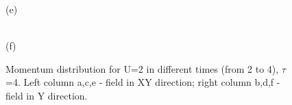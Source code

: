 \begin{figure}[h!]
\begin{minipage}[h]{0.43\linewidth}
\end{minipage}
\begin{minipage}[h]{0.43\linewidth}
 (e) \\
\end{minipage}
\hfill
\begin{minipage}[h]{0.43\linewidth}
 \\(f)
\end{minipage}
\caption{Momentum distribution for U=2 in different times (from 2 to 4), $\tau$=4. Left column a,c,e - field in XY direction; right column b,d,f - field in Y direction.}
\label{fig:md_u2_08A}
\end{figure}


